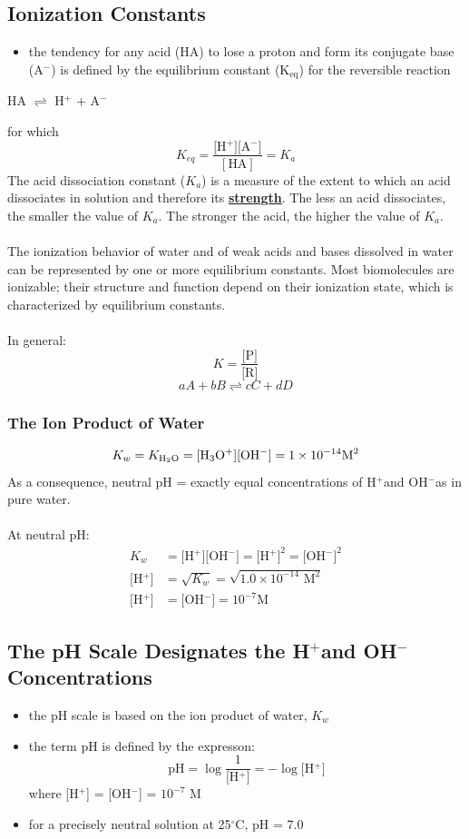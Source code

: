 \documentclass[10pt]{article}
\newcommand{\water}{\text{H$_2$O}}
\newcommand{\pc}{$^+$}
\newcommand{\nc}{$^-$}
\begin{document}
\subsection*{Ionization Constants}
\begin{itemize}
    \item the tendency for any acid (HA) to lose a proton and form
    its conjugate base (A$^-$) is defined by the equilibrium
    constant (K$_{\text{eq}}$) for the reversible reaction
\end{itemize}
\begin{center}
HA $\rightleftharpoons$ H$^+$ + A$^-$
\end{center}
for which
\[K_{eq} = \frac{\text{[H\pc][A\nc]}}{[\text{HA}]} = K_a\]
The acid dissociation constant ($K_a$) is a measure of the extent to which an acid dissociates in solution and therefore its \textbf{\underline{strength}}.  The less an acid dissociates, the smaller the value of $K_a$.  The stronger the acid, the higher the value of $K_a$.\\\\
The ionization behavior of water and of weak acids and bases dissolved in water can be represented by one or more equilibrium constants.
Most biomolecules are ionizable; their structure and function depend on their ionization state, which is characterized by equilibrium constants.\\\\
In general:
\[K = \frac{\text{[P]}}{\text{[R]}}\]
\[aA + bB \rightleftharpoons cC + dD\]
\subsubsection*{The Ion Product of Water}
\[K_w = K_{\text{\water}} = \text{[H$_3$O$^+$][OH$^-$]} = 1 \times 10^{-14} \text{M}^2\]
As a consequence, neutral pH = exactly equal concentrations of H\pc and OH\nc as in pure water.\\\\
At neutral pH:
\begin{align*}
K_w &= \text{[H$^+$][OH$^-$]} = \text{[H$^+$]}^2 = \text{[OH$^-$]}^2\\
\text{[H$^+$]} &= \sqrt{K_w} = \sqrt{1.0 \times 10^{-14} \text{ M}^2}\\
\text{[H$^+$]} &= \text{[OH$^-$]} = 10^{-7} \text{M}
\end{align*}
\subsection*{The pH Scale Designates the H\pc and OH\nc Concentrations}
\begin{itemize}
    \item the pH scale is based on the ion product of water, $K_w$
    \item the term pH is defined by the expresson:
    \[\text{pH} = \log\frac{1}{\text{[H$^+$]}} = -\log \text{[H$^+$]}\]
    where
    [H$^+$] = [OH$^-$] = $10^{-7}$ M
    \item for a precisely neutral solution at 25$^\circ$C, pH = 7.0
\end{itemize}
\end{document}
